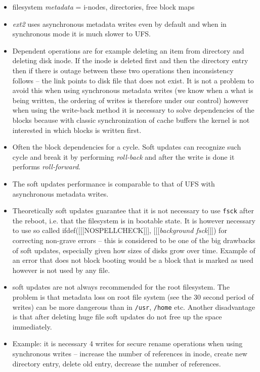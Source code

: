 \begin{itemize}
\item filesystem \emph{metadata} = i-nodes, directories, free block
maps
\item \emph{ext2} uses asynchronous metadata writes even by default and when
in synchronous mode it is much slower to UFS.
\item Dependent operations are for example deleting an item from directory and
deleting disk inode. If the inode is deleted first and then the directory entry
then if there is outage between these two operations then inconsistency follows
-- the link points to disk file that does not exist. It is not a problem to
avoid this when using synchronous metadata writes (we know when a what is being
written, the ordering of writes is therefore under our control) however when
using the write-back method it is necessary to solve dependencies of the blocks
because with classic synchronization of cache buffers the kernel is not
interested in which blocks is written first.
\item Often the block dependencies for a cycle. Soft updates can recognize such
cycle and break it by performing \emph{roll-back} and after the write is done it
performs \emph{roll-forward}.
\item The soft updates performance is comparable to that of UFS with
asynchronous metadata writes.
\item Theoretically soft updates guarantee that it is not necessary to use
\texttt{fsck} after the reboot, i.e. that the filesystem is in bootable state.
It is however necessary to use so called ifdef([[[NOSPELLCHECK]]],
[[[\emph{background fsck}]]]) for correcting non-grave errors -- this is
considered to be one of the big drawbacks of soft updates, especially given how
sizes of disks grow over time. Example of an error that does not block booting
would be a block that is marked as used however is not used by any file.
\item soft updates are not always recommended for the root filesystem.
The problem is that metadata loss on root file system (see the 30 second
period of writes) can be more dangerous than in \texttt{/usr}, \texttt{/home}
etc. Another disadvantage is that after deleting huge file soft updates do not
free up the space immediately.
\item Example: it is necessary 4 writes for secure rename operations when using
synchronous writes -- increase the number of references in inode, create new
directory entry, delete old entry, decrease the number of references.

\end{itemize}

